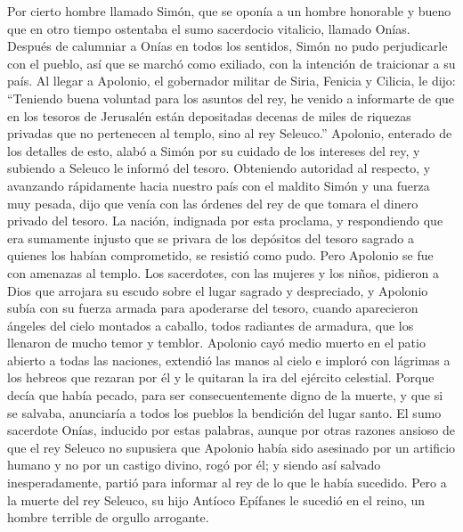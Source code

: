  Por cierto hombre llamado Simón, que se oponía a un
hombre honorable y bueno que en otro tiempo ostentaba el sumo sacerdocio
vitalicio, llamado Onías. Después de calumniar a Onías en todos los
sentidos, Simón no pudo perjudicarle con el pueblo, así que se marchó
como exiliado, con la intención de traicionar a su país. 
Al llegar a Apolonio, el gobernador militar de Siria, Fenicia y Cilicia,
le dijo:  ``Teniendo buena voluntad para los asuntos del
rey, he venido a informarte de que en los tesoros de Jerusalén están
depositadas decenas de miles de riquezas privadas que no pertenecen al
templo, sino al rey Seleuco.''  Apolonio, enterado de los
detalles de esto, alabó a Simón por su cuidado de los intereses del rey,
y subiendo a Seleuco le informó del tesoro.  Obteniendo
autoridad al respecto, y avanzando rápidamente hacia nuestro país con el
maldito Simón y una fuerza muy pesada,  dijo que venía con
las órdenes del rey de que tomara el dinero privado del tesoro.
 La nación, indignada por esta proclama, y respondiendo
que era sumamente injusto que se privara de los depósitos del tesoro
sagrado a quienes los habían comprometido, se resistió como pudo.
 Pero Apolonio se fue con amenazas al templo.
 Los sacerdotes, con las mujeres y los niños, pidieron a
Dios que arrojara su escudo sobre el lugar sagrado y despreciado,
 y Apolonio subía con su fuerza armada para apoderarse
del tesoro, cuando aparecieron ángeles del cielo montados a caballo,
todos radiantes de armadura, que los llenaron de mucho temor y temblor.
 Apolonio cayó medio muerto en el patio abierto a todas
las naciones, extendió las manos al cielo e imploró con lágrimas a los
hebreos que rezaran por él y le quitaran la ira del ejército celestial.
 Porque decía que había pecado, para ser consecuentemente
digno de la muerte, y que si se salvaba, anunciaría a todos los pueblos
la bendición del lugar santo.  El sumo sacerdote Onías,
inducido por estas palabras, aunque por otras razones ansioso de que el
rey Seleuco no supusiera que Apolonio había sido asesinado por un
artificio humano y no por un castigo divino, rogó por él;
 y siendo así salvado inesperadamente, partió para
informar al rey de lo que le había sucedido.  Pero a la
muerte del rey Seleuco, su hijo Antíoco Epífanes le sucedió en el reino,
un hombre terrible de orgullo arrogante.

